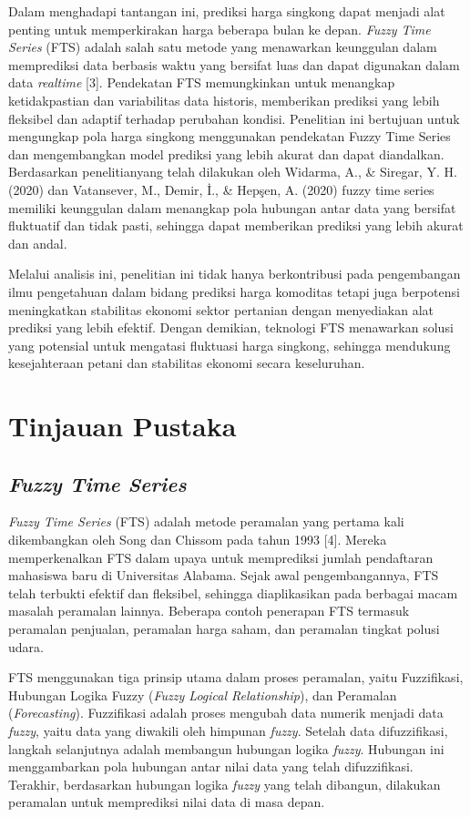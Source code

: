 \documentclass[conference]{IEEEtran}
\begin{document}
Dalam menghadapi tantangan ini, prediksi harga singkong dapat menjadi alat penting untuk memperkirakan harga beberapa bulan ke depan. \textit{Fuzzy Time Series} (FTS) adalah salah satu metode yang menawarkan keunggulan dalam memprediksi data berbasis waktu yang bersifat luas dan dapat digunakan dalam data \textit{realtime} [3]. Pendekatan FTS memungkinkan untuk menangkap ketidakpastian dan variabilitas data historis, memberikan prediksi yang lebih fleksibel dan adaptif terhadap perubahan kondisi. Penelitian ini bertujuan untuk mengungkap pola harga singkong menggunakan pendekatan Fuzzy Time Series dan mengembangkan model prediksi yang lebih akurat dan dapat diandalkan. Berdasarkan penelitianyang telah dilakukan oleh Widarma, A., \& Siregar, Y. H. (2020) dan Vatansever, M., Demir, İ., \& Hepşen, A. (2020)  fuzzy time series memiliki keunggulan dalam menangkap pola hubungan antar data yang bersifat fluktuatif dan tidak pasti, sehingga dapat memberikan prediksi yang lebih akurat dan andal.

Melalui analisis ini, penelitian ini tidak hanya berkontribusi pada pengembangan ilmu pengetahuan dalam bidang prediksi harga komoditas tetapi juga berpotensi meningkatkan stabilitas ekonomi sektor pertanian dengan menyediakan alat prediksi yang lebih efektif. Dengan demikian, teknologi FTS menawarkan solusi yang potensial untuk mengatasi fluktuasi harga singkong, sehingga mendukung kesejahteraan petani dan stabilitas ekonomi secara keseluruhan.


\section{Tinjauan Pustaka}

\subsection{\textit{Fuzzy Time Series}}
\textit{Fuzzy Time Series} (FTS) adalah metode peramalan yang pertama kali dikembangkan oleh Song dan Chissom pada tahun 1993 [4]. Mereka memperkenalkan FTS dalam upaya untuk memprediksi jumlah pendaftaran mahasiswa baru di Universitas Alabama. Sejak awal pengembangannya, FTS telah terbukti efektif dan fleksibel, sehingga diaplikasikan pada berbagai macam masalah peramalan lainnya. Beberapa contoh penerapan FTS termasuk peramalan penjualan, peramalan harga saham, dan peramalan tingkat polusi udara.

FTS menggunakan tiga prinsip utama dalam proses peramalan, yaitu Fuzzifikasi, Hubungan Logika Fuzzy (\textit{Fuzzy Logical Relationship}), dan Peramalan (\textit{Forecasting}). Fuzzifikasi adalah proses mengubah data numerik menjadi data \textit{fuzzy}, yaitu data yang diwakili oleh himpunan \textit{fuzzy}. Setelah data difuzzifikasi, langkah selanjutnya adalah membangun hubungan logika \textit{fuzzy}. Hubungan ini menggambarkan pola hubungan antar nilai data yang telah difuzzifikasi. Terakhir, berdasarkan hubungan logika \textit{fuzzy} yang telah dibangun, dilakukan peramalan untuk memprediksi nilai data di masa depan.
\end{document}
